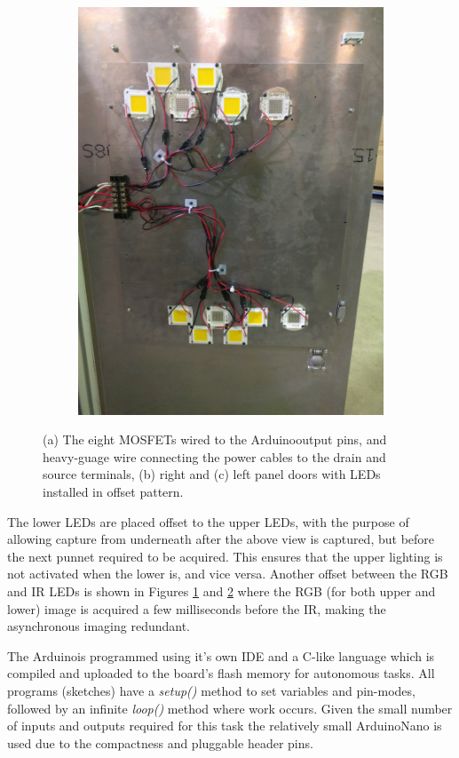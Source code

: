 \documentclass[fleqn,twoside,12pt]{report}
\begin{document}
\begin{figure}[h]
\begin{subfigure}{0.25\textwidth}
		\caption{}
		\label{fig:LED_door_1}
	\end{subfigure}%
	\begin{subfigure}{0.25\textwidth}
		\centering
		\includegraphics[width=0.8\linewidth]{LED_door_2.jpg}
		\caption{}
		\label{fig:LED_door_2}
	\end{subfigure}%
	\caption{(a) The eight MOSFETs wired to the Arduino\texttrademark output pins, and heavy-guage wire connecting the power cables to the drain and source terminals, (b) right and (c) left panel doors with LEDs installed in offset pattern.}
	\label{}
\end{figure}

The lower LEDs are placed offset to the upper LEDs, with the purpose of allowing capture from underneath after the above view is captured, but before the next punnet required to be acquired. This ensures that the upper lighting is not activated when the lower is, and vice versa. Another offset between the RGB and IR LEDs is shown in Figures \ref{fig:LED_door_1} and \ref{fig:LED_door_2} where the RGB (for both upper and lower) image is acquired a few milliseconds before the IR, making the asynchronous imaging redundant.

The Arduino\texttrademark is programmed using it's own IDE and a C-like language which is compiled and uploaded to the board's flash memory for autonomous tasks. All programs (sketches) have a \textit{setup()} method to set variables and pin-modes, followed by an infinite \textit{loop()} method where work occurs. Given the small number of inputs and outputs required for this task the relatively small Arduino\texttrademark Nano is used due to the compactness and pluggable header pins.
\end{document}
